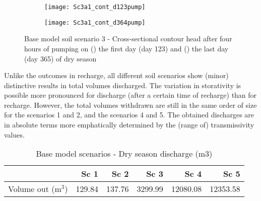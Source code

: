 

\begin{figure}[h!]
	\centering
	\begin{subfigure}[b]{0.5\linewidth}
		\centering\texttt{[image: Sc3a1\_cont\_d123pump]}
		\captionsetup{justification=centering}		
		\caption{\label{fig:Sc3a1_cont_d123pump}}
		\end{subfigure}\hfill
	\begin{subfigure}[b]{0.5\linewidth}
        \centering\texttt{[image: Sc3a1\_cont\_d364pump]}
		\captionsetup{justification=centering}		
		\caption{\label{fig:Sc3a1_cont_d364pump}}
		\end{subfigure}
		\captionsetup{justification=centering}	
	\caption{Base model soil scenario 3 - Cross-sectional contour head after four hours of pumping on () the first day (day 123) and () the last day (day 365) of dry season} 
	\label{fig:Example_Sc3_base_cont_dry}
\end{figure} 

Unlike the outcomes in recharge, all different soil scenarios show (minor) distinctive results in total volumes discharged. The variation in storativity is possible more pronounced for discharge (after a certain time of recharge) than for recharge. However, the total volumes withdrawn are still in the same order of size for the scenarios 1 and 2, and the scenarios 4 and 5. The obtained discharges are in absolute terms more emphatically determined by the (range of) transmissivity values. 

\begin{table}[h!]
\small
\centering
\caption{Base model scenarios - Dry season discharge (m3)}
\label{tab:Base_discharge}
\begin{tabular}{l|r|r|r|r|r}
\hline 
\textbf{}               & \textbf{Sc 1} & \textbf{Sc 2} & \textbf{Sc 3} & \textbf{Sc 4}  & \textbf{Sc 5} \\ \hline \hline
Volume out (m$^3$)       & 129.84        & 137.76        & 3299.99       & 12080.08 	      & 12353.58          \\ \hline    
\end{tabular}
\end{table}

